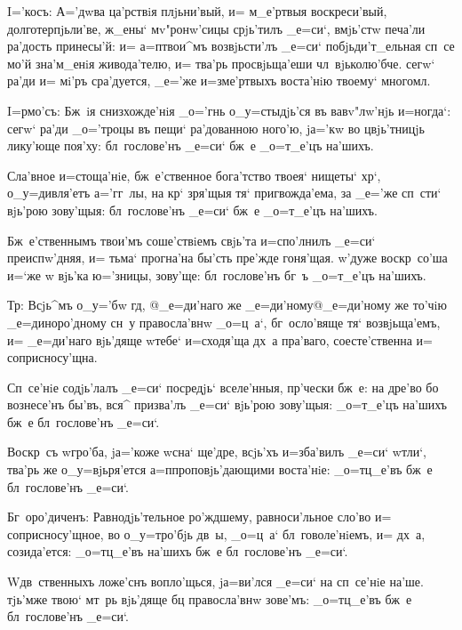 I='косъ: А='дwва ца'рствiя плjьни'вый, и= м_е'ртвыя 
воскреси'вый, долготерпjьли'ве, ж_ены` мv"ронw'сицы 
срjь'тилъ _е=си`, вмjь'стw печа'ли ра'дость принесы'й: и= 
а=п твои^мъ возвjьсти'лъ _е=си` побjьди'т_ельная 
сп~се мо'й зна'м_енiя живода'телю, и= тва'рь 
просвjьща'еши чл~вjьколю'бче. сегw` ра'ди и= мi'ръ 
сра'дуется, _е='же и=з\ъ ме'ртвыхъ воста'нiю твоему` 
многомл.


I=рмо'съ: Бж~iя снизхожде'нiя _о='гнь о_у=стыдjь'ся въ 
вавv"лw'нjь и=ногда`: сегw` ра'ди _о='троцы въ пещи` 
ра'дованною ного'ю, jа='кw во цвjь'тницjь лику'юще 
поя'ху: бл~гослове'нъ _е=си` бж~е _о=т_е'цъ на'шихъ.

Сла'вное и=стоща'нiе, бж~е'ственное бога'тство твоея` 
нищеты` хр`, о_у=дивля'етъ а='гг~лы, на кр` 
зря'щыя тя` пригвожда'ема, за _е='же сп~сти` вjь'рою 
зову'щыя: бл~гослове'нъ _е=си` бж~е _о=т_е'цъ на'шихъ.

Бж~е'ственнымъ твои'мъ соше'ствiемъ свjь'та 
и=спо'лнилъ _е=си` преиспw'дняя, и= тьма` прогна'на 
бы'сть пре'жде гоня'щая. w'дуже воскр~со'ша и=`же w\т 
вjь'ка ю='зницы, зову'ще: бл~гослове'нъ бг~ъ _о=т_е'цъ 
на'шихъ.

Тр: Всjь^мъ о_у='бw гд, @_е=ди'наго же 
_е=ди'ному@{_е=ди'ному же то'чiю} _е=диноро'дному сн~у 
правосла'внw _о=ц~а`, бг~осло'вяще тя` возвjьща'емъ, и= 
_е=ди'наго вjь'дяще w\т тебе` и=сходя'ща дх~а пра'ваго, 
соесте'ственна и= соприсносу'щна.


Сп~се'нiе содjь'лалъ _е=си` посредjь` вселе'нныя, 
пр'чески бж~е: на дре'во бо вознесе'нъ бы'въ, вся^ 
призва'лъ _е=си` вjь'рою зову'щыя: _о=т_е'цъ на'шихъ бж~е 
бл~гослове'нъ _е=си`.

Воскр~съ w\т гро'ба, jа='коже w\т сна` ще'дре, всjь'хъ 
и=зба'вилъ _е=си` w\т тли`, тва'рь же о_у=вjьря'ется 
а=п проповjь'дающими воста'нiе: _о=тц_е'въ бж~е 
бл~гослове'нъ _е=си`.

Бг~оро'диченъ: Равнодjь'тельное ро'ждшему, 
равноси'льное сло'во и= соприсносу'щное, во о_у=тро'бjь 
дв~ы, _о=ц~а` бл~говоле'нiемъ, и= дх~а, созида'ется: 
_о=тц_е'въ на'шихъ бж~е бл~гослове'нъ _е=си`.


W\т дв~ственныхъ ложе'снъ вопло'щься, jа=ви'лся _е=си` 
на сп~се'нiе на'ше. тjь'мже твою` мт~рь вjь'дяще бц 
правосла'внw зове'мъ: _о=тц_е'въ бж~е бл~гослове'нъ 
_е=си`.

